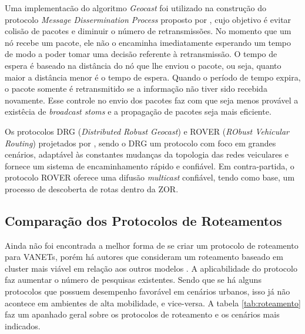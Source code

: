 \documentclass[
	12pt,				%
	oneside,			%
	a4paper,			%
	english,			%
	brazil				%
	]{abntex2ppgsi}
\begin{document}
Uma implementacão do algoritmo \textit{Geocast} foi utilizado na construção do protocolo \textit{Message Dissermination Process} proposto por  , cujo objetivo é evitar colisão de pacotes e diminuir o número de retransmissões. No momento que um nó recebe um pacote, ele não o encaminha imediatamente esperando um tempo de  modo a poder tomar uma decisão referente à retransmissão. O tempo de espera é baseado na distância do nó que lhe enviou o pacote, ou seja, quanto maior a distância menor é o tempo de espera. Quando o período de tempo expira, o pacote somente é retransmitido se a informação não tiver sido recebida novamente. Esse controle no envio dos pacotes  faz com que seja menos provável a existêcia de \textit{broadcast stoms} e a propagação de pacotes seja mais eficiente.

Os protocolos DRG (\textit{Distributed Robust Geocast}) e ROVER (\textit{RObust Vehicular Routing}) projetados por , sendo o DRG um protocolo com foco em grandes cenários, adaptável às constantes mudanças da topologia das redes veiculares e fornece um sistema de encaminhamento rápido e confiável. Em contra-partida, o protocolo ROVER oferece uma difusão \textit{multicast} confiável, tendo como base, um processo de descoberta de rotas dentro da ZOR.

\subsection{Comparação dos Protocolos de Roteamentos}

Ainda não foi encontrada a melhor forma de se criar um protocolo de roteamento para VANETs, porém há autores que consideram um roteamento baseado em cluster mais viável em relação aos outros modelos \cite{luis2009melhoria}. A aplicabilidade do protocolo faz aumentar o número de pesquisas existentes. Sendo que se há alguns protocolos que possuem desempenho favorável em cenários urbanos, isso já não acontece em ambientes de alta mobilidade, e vice-versa. A tabela \ref{tab:roteamento} faz um apanhado geral sobre os protocolos de roteamento e os cenários mais indicados.
\end{document}
